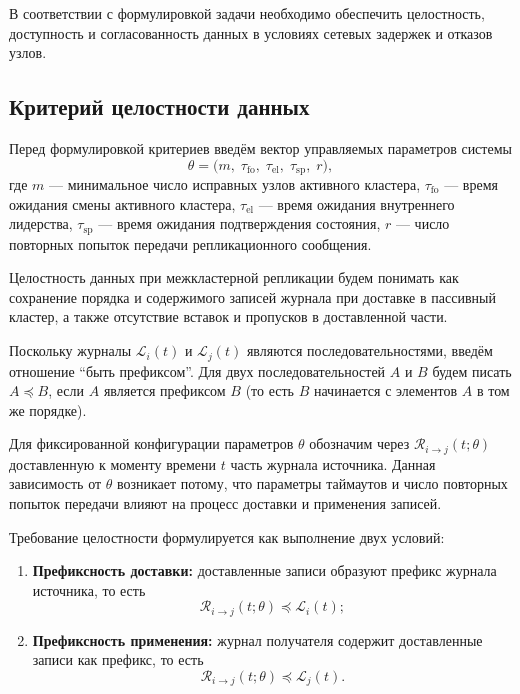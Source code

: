 В соответствии с формулировкой задачи необходимо обеспечить
целостность, доступность и согласованность данных
в условиях сетевых задержек и отказов узлов.

\subsection{Критерий целостности данных}

Перед формулировкой критериев введём вектор управляемых параметров системы
\[
\theta=
\bigl(
m,\;
\tau_{\mathrm{fo}},\;
\tau_{\mathrm{el}},\;
\tau_{\mathrm{sp}},\;
r
\bigr),
\]
где $m$ — минимальное число исправных узлов активного кластера,
$\tau_{\mathrm{fo}}$ — время ожидания смены активного кластера,
$\tau_{\mathrm{el}}$ — время ожидания внутреннего лидерства,
$\tau_{\mathrm{sp}}$ — время ожидания подтверждения состояния,
$r$ — число повторных попыток передачи репликационного сообщения.

Целостность данных при межкластерной репликации будем понимать как
сохранение порядка и содержимого записей журнала при доставке в пассивный кластер,
а также отсутствие вставок и пропусков в доставленной части.

Поскольку журналы $\mathcal{L}_i(t)$ и $\mathcal{L}_j(t)$ являются последовательностями,
введём отношение ``быть префиксом''.
Для двух последовательностей $A$ и $B$ будем писать $A \preceq B$,
если $A$ является префиксом $B$ (то есть $B$ начинается с элементов $A$
в том же порядке).

Для фиксированной конфигурации параметров $\theta$
обозначим через $\mathcal{R}_{i\to j}(t;\theta)$
доставленную к моменту времени $t$ часть журнала источника.
Данная зависимость от $\theta$ возникает потому,
что параметры таймаутов и число повторных попыток передачи
влияют на процесс доставки и применения записей.

Требование целостности формулируется как выполнение двух условий:

\begin{enumerate}
\item \textbf{Префиксность доставки:}
доставленные записи образуют префикс журнала источника,
то есть
\[
\mathcal{R}_{i\to j}(t;\theta) \preceq \mathcal{L}_i(t);
\]

\item \textbf{Префиксность применения:}
журнал получателя содержит доставленные записи как префикс,
то есть
\[
\mathcal{R}_{i\to j}(t;\theta) \preceq \mathcal{L}_j(t).
\]
\end{enumerate}

